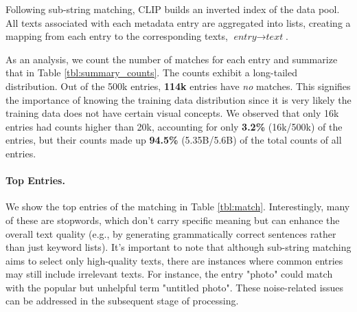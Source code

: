\documentclass{article} %
\begin{document}
Following sub-string matching, CLIP builds an inverted index of the data pool. All texts associated with each metadata entry are aggregated into lists, creating a mapping from each entry to the corresponding texts,  $\textit{entry} \rightarrow \textit{text}$.

As an analysis, we count the number of matches for each entry and summarize that in Table \ref{tbl:summary_counts}.
The counts exhibit a long-tailed distribution. Out of the 500k entries, \textbf{114k} entries have \textit{no} matches. This signifies the importance of knowing the training data distribution since it is very likely the training data does not have certain visual concepts.
We observed that only 16k entries had counts higher than 20k, accounting for only \textbf{3.2\%} (16k/500k) of the entries, but their counts made up \textbf{94.5\%} (5.35B/5.6B) of the total counts of all entries.

\begin{table}
\centering
{}
\caption{Summary of counts for entries.}
\label{tbl:summary_counts}
\end{table}

\paragraph{Top Entries.}
We show the top entries of the matching in Table \ref{tbl:match}. 
Interestingly, many of these are stopwords, which don't carry specific meaning but can enhance the overall text quality (e.g., by generating grammatically correct sentences rather than just keyword lists). It's important to note that although sub-string matching aims to select only high-quality texts, there are instances where common entries may still include irrelevant texts. For instance, the entry "photo" could match with the popular but unhelpful term "untitled photo". These noise-related issues can be addressed in the subsequent stage of processing.


\begin{table}
\centering
{}
\caption{Top-20 entries with counts.}
\label{tbl:match}
\end{table}
\end{document}
